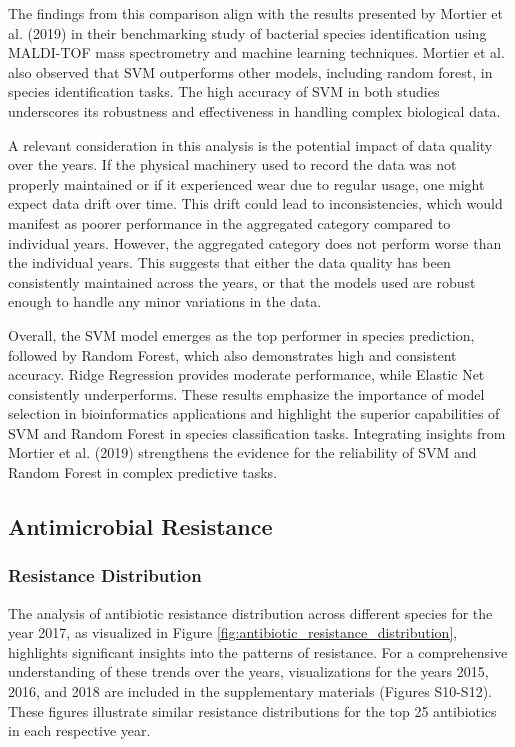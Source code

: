 \documentclass[english,11pt,a4paper,titlepage]{article}
\begin{document}
The findings from this comparison align with the results presented by Mortier et al. (2019) \cite{mortierBacterialSpeciesIdentification2021} in their benchmarking study of bacterial species identification using MALDI-TOF mass spectrometry and machine learning techniques. Mortier et al. also observed that SVM outperforms other models, including random forest, in species identification tasks. The high accuracy of SVM in both studies underscores its robustness and effectiveness in handling complex biological data.

A relevant consideration in this analysis is the potential impact of data quality over the years. If the physical machinery used to record the data was not properly maintained or if it experienced wear due to regular usage, one might expect data drift over time. This drift could lead to inconsistencies, which would manifest as poorer performance in the aggregated category compared to individual years. However, the aggregated category does not perform worse than the individual years. This suggests that either the data quality has been consistently maintained across the years, or that the models used are robust enough to handle any minor variations in the data.

Overall, the SVM model emerges as the top performer in species prediction, followed by Random Forest, which also demonstrates high and consistent accuracy. Ridge Regression provides moderate performance, while Elastic Net consistently underperforms. These results emphasize the importance of model selection in bioinformatics applications and highlight the superior capabilities of SVM and Random Forest in species classification tasks. Integrating insights from Mortier et al. (2019) strengthens the evidence for the reliability of SVM and Random Forest in complex predictive tasks.

\subsection*{Antimicrobial Resistance}
\subsubsection*{Resistance Distribution}
The analysis of antibiotic resistance distribution across different species for the year 2017, as visualized in Figure \ref{fig:antibiotic_resistance_distribution}, highlights significant insights into the patterns of resistance. For a comprehensive understanding of these trends over the years, visualizations for the years 2015, 2016, and 2018 are included in the supplementary materials (Figures S10-S12). These figures illustrate similar resistance distributions for the top 25 antibiotics in each respective year.
\end{document}
